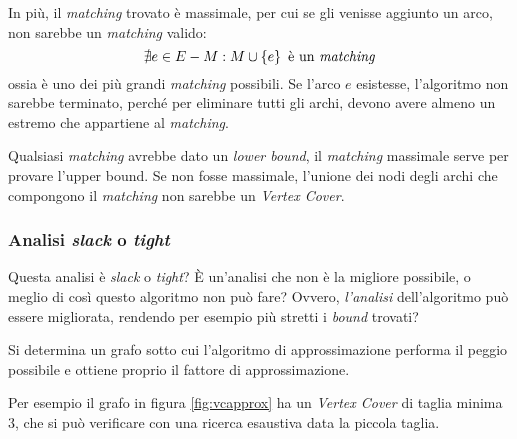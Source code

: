 In più, il \emph{matching} trovato è massimale, per cui se gli venisse aggiunto un arco, non sarebbe un \emph{matching} valido: 
\begin{equation*}
    \nexists e \in E - M : M \cup \left\{ e \right\} \text{ è un \emph{matching}}
\end{equation*}
ossia è uno dei più grandi \emph{matching} possibili.
Se l'arco $e$ esistesse, l'algoritmo non sarebbe terminato, perché  per eliminare tutti gli archi, devono avere almeno un estremo che appartiene al \emph{matching}.

Qualsiasi \emph{matching} avrebbe dato un \emph{lower bound}, il \emph{matching} massimale serve per provare l'upper bound. Se non fosse massimale, l'unione dei nodi degli archi che compongono il \emph{matching} non sarebbe un \emph{Vertex Cover}.

\subsubsection{Analisi \emph{slack} o \emph{tight}}

Questa analisi è \emph{slack} o \emph{tight}? È un'analisi che non è la migliore possibile, o meglio di così questo algoritmo non può fare?
Ovvero, \emph{l'analisi} dell'algoritmo può essere migliorata, rendendo per esempio più stretti i \emph{bound} trovati?

Si determina un grafo sotto cui l'algoritmo di approssimazione performa il peggio possibile e ottiene proprio il fattore di approssimazione.

Per esempio il grafo in figura \ref{fig:vcapprox} ha un \emph{Vertex Cover} di taglia minima $3$, che si può verificare con una ricerca esaustiva data la piccola taglia.

